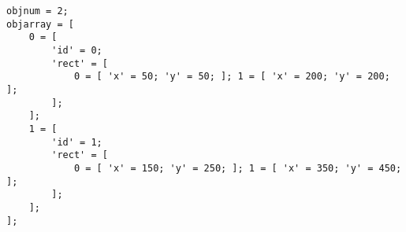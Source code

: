 \begin{verbatim}
objnum = 2;
objarray = [
    0 = [
        'id' = 0;
        'rect' = [
            0 = [ 'x' = 50; 'y' = 50; ]; 1 = [ 'x' = 200; 'y' = 200; ];
        ];
    ];
    1 = [
        'id' = 1;
        'rect' = [
            0 = [ 'x' = 150; 'y' = 250; ]; 1 = [ 'x' = 350; 'y' = 450; ];
        ];
    ];
];
\end{verbatim}
